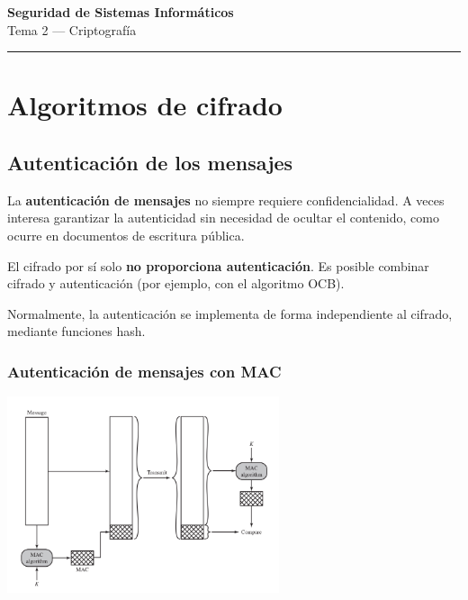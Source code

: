 \documentclass[11pt,a4paper]{article}
\newcommand{\asignatura}{Seguridad de Sistemas Informáticos}
\newcommand{\tema}{Tema 2 — Criptografía}
\begin{document}
\begin{center}
    {\LARGE \textbf{\asignatura}}\\[0.3cm]
    {\large \tema}\\[0.2cm]
\end{center}
\hrule
\vspace{1em}

\tableofcontents

\section{Algoritmos de cifrado}
\subsection{Autenticación de los mensajes}

\begin{DefBox}
La \textbf{autenticación de mensajes} no siempre requiere confidencialidad.
A veces interesa garantizar la autenticidad sin necesidad de ocultar el contenido, como ocurre en documentos de escritura pública.
\end{DefBox}

\begin{NotaBox}
El cifrado por sí solo \textbf{no proporciona autenticación}.
Es posible combinar cifrado y autenticación (por ejemplo, con el algoritmo OCB).
\end{NotaBox}

Normalmente, la autenticación se implementa de forma independiente al cifrado, mediante funciones hash.

\subsubsection*{Autenticación de mensajes con MAC}
\begin{center}
    \includegraphics[width=0.6\textwidth]{resources/MAC.png}
\end{center}
\end{document}
